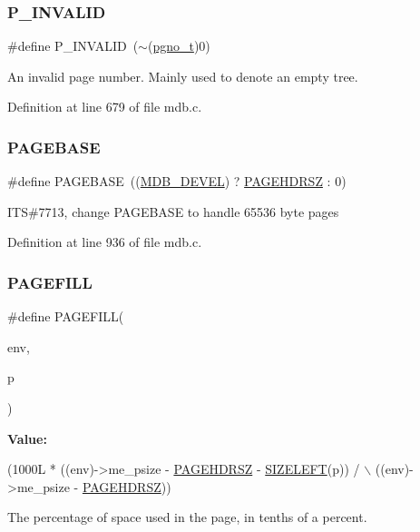 \subsubsection{\texorpdfstring{P\+\_\+\+I\+N\+V\+A\+L\+ID}{P\_INVALID}}
{\footnotesize\ttfamily \#define P\+\_\+\+I\+N\+V\+A\+L\+ID~($\sim$(\mbox{\hyperlink{group__internal_gadb65f0424c9d3827bf6409087ad555cd}{pgno\+\_\+t}})0)}

An invalid page number. Mainly used to denote an empty tree. 

Definition at line 679 of file mdb.\+c.

\mbox{\label{group__internal_ga42d35f5d5bf3f161dc064ac7f78a2838}} 
\subsubsection{\texorpdfstring{P\+A\+G\+E\+B\+A\+SE}{PAGEBASE}}
{\footnotesize\ttfamily \#define P\+A\+G\+E\+B\+A\+SE~((\mbox{\hyperlink{group__compat_ga103b045068a1d21bf2347a7342f8f486}{M\+D\+B\+\_\+\+D\+E\+V\+EL}}) ? \mbox{\hyperlink{group__internal_gae25bcf0c0c5c5ead27e82543cbce02e1}{P\+A\+G\+E\+H\+D\+R\+SZ}} \+: 0)}

I\+TS\#7713, change P\+A\+G\+E\+B\+A\+SE to handle 65536 byte pages 

Definition at line 936 of file mdb.\+c.

\mbox{\label{group__internal_ga5c5f96738000941699ea8118631b2792}} 
\subsubsection{\texorpdfstring{P\+A\+G\+E\+F\+I\+LL}{PAGEFILL}}
{\footnotesize\ttfamily \#define P\+A\+G\+E\+F\+I\+LL(\begin{DoxyParamCaption}\item[{}]{env,  }\item[{}]{p }\end{DoxyParamCaption})}

{\bfseries Value\+:}
\begin{DoxyCode}
(1000L * ((env)->me\_psize - \mbox{\hyperlink{group__internal_gae25bcf0c0c5c5ead27e82543cbce02e1}{PAGEHDRSZ}} - \mbox{\hyperlink{group__internal_gadec51e874501c53388b820f27a937654}{SIZELEFT}}(p)) / \(\backslash\)
                ((env)->me\_psize - \mbox{\hyperlink{group__internal_gae25bcf0c0c5c5ead27e82543cbce02e1}{PAGEHDRSZ}}))
\end{DoxyCode}
The percentage of space used in the page, in tenths of a percent. 

